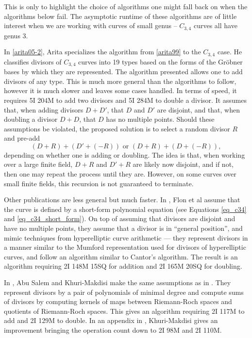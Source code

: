This is only to highlight the choice of algorithms one might fall back on when the algorithms below fail.
The asymptotic runtime of these algorithms are of little interest when we are working with curves of small genus --
$C_{3,4}$ curves all have genus 3.

In \ref{arita05-2}, Arita specializes the algorithm from \ref{arita99} to the $C_{3,4}$ case.
He classifies divisors of $C_{3,4}$ curves into 19 types based on the forms of the Gr\"obner bases by which they are represented.
The algorithm presented allows one to add divisors of any type.
This is much more general than the algorithms to follow, however it is much slower and leaves some cases handled.
In terms of speed, it requires 5I 204M to add two divisors and 5I 284M to double a divisor.
It assumes that, when adding divisors $D + D'$, that $D$ and $D'$ are disjoint,
and that, when doubling a divisor $D + D$, that $D$ has no multiple points.
Should these assumptions be violated, the proposed solution is to select a random divisor $R$ and pre-add
\[  (D + R) + (D' + (-R)) \text { or } (D + R) + (D + (-R)), \]
depending on whether one is adding or doubling.
The idea is that, when working over a large finite field, $D + R$ and $D' + R$ are likely now disjoint,
and if not, then one may repeat the process until they are.
However, on some curves over small finite fields, this recursion is not guaranteed to terminate.

Other publications are less general but much faster.
In \cite{flon08}, Flon et al assume that the curve is defined by a short-form polynomial equation
(see Equations \ref{eq_c34} and \ref{eq_c34_short_form}).
On top of assuming that divisors are disjoint and have no multiple points, 
they assume that a divisor is in ``general position'', and mimic techniques from hyperelliptic curve arithmetic ---
they represent divisors in a manner similar to the Mumford representation used for divisors of hyperelliptic curves,
and follow an algorithm similar to Cantor's algorithm.
The result is an algorithm requiring 2I 148M 15SQ for addition and 2I 165M 20SQ for doubling.

In \cite{salem07}, Abu Salem and Khuri-Makdisi make the same assumptions as in \cite{flon08}.
They represent divisors by a pair of polynomials of minimal degree and compute sums of divisors
by computing kernels of maps between Riemann-Roch spaces and quotients of Riemann-Roch spaces.
This gives an algorithm requiring 2I 117M to add and 2I 129M to double.
In an appendix in \cite{makdisi18}, Khuri-Makdisi gives an improvement bringing the operation count down to 2I 98M and 2I 110M.

